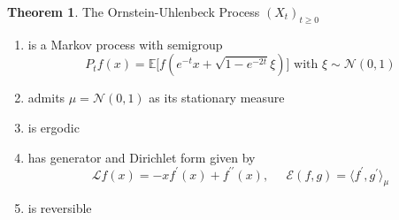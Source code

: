 \documentclass{article}
\theoremstyle{definition}
\newtheorem{theorem}{Theorem}[section]
\theoremstyle{remark}
\theoremstyle{definition}
\begin{document}
\begin{theorem}
The Ornstein-Uhlenbeck Process $(X_t)_{t \geq 0}$ 
\begin{enumerate}
    \item is a Markov process with semigroup 
    \[P_t f(x) = \mathbb{E} \big[ f(e^{-t} x + \sqrt{1 - e^{-2t}} \xi) \big] \text{ with } \xi \sim \mathcal{N}(0, 1)\]
    \item admits $\mu = \mathcal{N}(0, 1)$ as its stationary measure
    \item is ergodic
    \item has generator and Dirichlet form given by 
    \[\mathscr{L} f(x) = -x f^{\prime} (x) + f^{\prime\prime} (x), \;\;\;\;\; \mathcal{E}(f, g) = \langle f^\prime , g^\prime \rangle_\mu\]
    \item is reversible
\end{enumerate}
\end{theorem}
\end{document}
